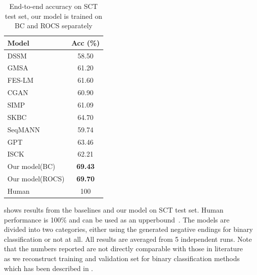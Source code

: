 \begin{table}[th]
 \small
\centering
\begin{tabular}{lc}
\hline
$\textbf{Model}$ & Acc (\%)\\
\hline
\hline
DSSM& 58.50\\
GMSA& 61.20\\
FES-LM&61.60\\
CGAN& 60.90 \\
SIMP&61.09\\
SKBC&64.70\\
SeqMANN& 59.74\\
GPT& 63.46 \\
ISCK& 62.21 \\
Our model(BC)& {\bf 69.43}\\
Our model(ROCS)& {\bf 69.70}\\

\hline
Human& 100\\
\hline
\end{tabular}
\caption{End-to-end accuracy on SCT test set, 
our model is trained on  BC and ROCS separately}
\label{tab:all-models}
\end{table}

 shows results from the baselines and our model on 
SCT test set. 
Human performance is 100\% and can be used as an 
upperbound~\cite{mostafazadeh2016corpus}. 
The models are divided into two
categories, either using 
the generated negative endings for binary classification or not at all. 
All results are averaged from
5 independent runs. Note that the numbers reported 
are not directly comparable with those in literature~\cite{srinivasan2018simple,roemmele2017rnn,
li2018multi,radford2018improving,chen2018incorporating} as we reconstruct 
training and validation set for binary classification methods which has been
described in .


